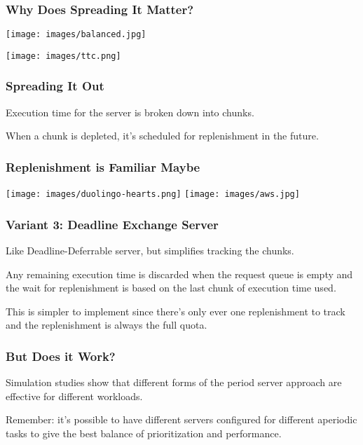 \begin{frame}
\frametitle{Why Does Spreading It Matter?}

\begin{center}
	\texttt{[image: images/balanced.jpg]}
\end{center}

\begin{center}
	\texttt{[image: images/ttc.png]}
\end{center}

\end{frame}

\begin{frame}
\frametitle{Spreading It Out}

Execution time for the server is broken down into chunks.

When a chunk is depleted, it's scheduled for replenishment in the future.

\end{frame}

\begin{frame}
\frametitle{Replenishment is Familiar Maybe}

\begin{center}
	\texttt{[image: images/duolingo-hearts.png]}
	\texttt{[image: images/aws.jpg]}
\end{center}

\end{frame}

\begin{frame}
\frametitle{Variant 3: Deadline Exchange Server}
Like Deadline-Deferrable server, but simplifies tracking the chunks.

Any remaining execution time is discarded when the request queue is empty and the wait for replenishment is based on the last chunk of execution time used.

This is simpler to implement since there's only ever one replenishment to track and the replenishment is always the full quota. 

\end{frame}

\begin{frame}
\frametitle{But Does it Work?}

Simulation studies show that different forms of the period server approach are effective for different workloads.

Remember: it's possible to have different servers configured for different aperiodic tasks to give the best balance of prioritization and performance.

\end{frame}

